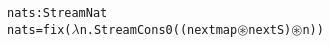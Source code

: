 \begin{alltt}
nats : Stream Nat
nats = fix(\(\lambda\)n. StreamCons 0 ((next map \(\circledast\) next S) \(\circledast\) n))
\end{alltt}
